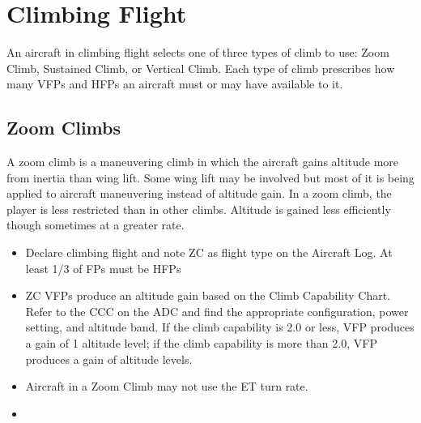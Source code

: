 \section{Climbing Flight}
\label{rule:climbing-flight}

An aircraft in climbing flight selects one of three types of climb to use: Zoom Climb, Sustained Climb, or Vertical Climb. Each type of climb prescribes how many VFPs and HFPs an aircraft must or may have available to it.

\subsection{Zoom Climbs}
\label{rule:zoom-climbs}

A zoom climb is a maneuvering climb in which the aircraft gains altitude more from inertia than wing lift. Some wing lift may be involved but most of it is being applied to aircraft maneuvering instead of altitude gain. In a zoom climb, the player is less restricted than in other climbs. Altitude is gained less efficiently though sometimes at a greater rate.

\begin{itemize}

    \item{} Declare climbing flight and note ZC as flight type on the Aircraft Log. At least 1/3 of FPs must be HFPs

    \item{} ZC VFPs produce an altitude gain based on the Climb Capability Chart. Refer to the CCC on the ADC and find the appropriate configuration, power setting, and altitude band. If the climb capability is 2.0 or less,  VFP produces a gain of 1 altitude level; if the climb capability is more than 2.0,  VFP produces a gain of  altitude levels.

    \item{} Aircraft in a Zoom Climb may not use the ET turn rate.

    \item{} 

\end{itemize}

